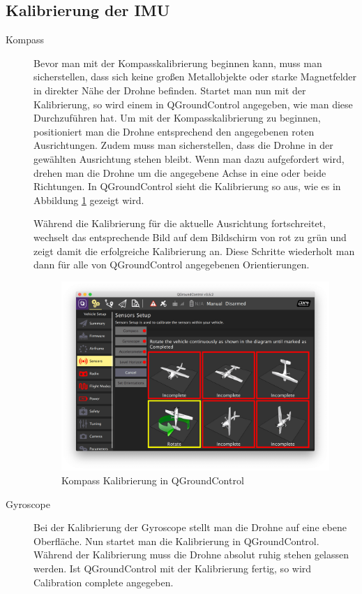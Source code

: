 \subsection{Kalibrierung der IMU}
\begin{description}
    \item[Kompass] Bevor man mit der Kompasskalibrierung beginnen kann, muss man sicherstellen, dass sich keine großen Metallobjekte oder starke Magnetfelder in direkter Nähe der Drohne befinden. Startet man nun mit der Kalibrierung, so wird einem in QGroundControl angegeben, wie man diese Durchzuführen hat. Um mit der Kompasskalibrierung zu beginnen, positioniert man die Drohne entsprechend den angegebenen roten Ausrichtungen. Zudem muss man sicherstellen, dass die Drohne in der gewählten Ausrichtung stehen bleibt. Wenn man dazu aufgefordert wird, drehen man die Drohne um die angegebene Achse in eine oder beide Richtungen. In QGroundControl sieht die Kalibrierung so aus, wie es in Abbildung \ref{fig:compass-calibration} gezeigt wird.

    Während die Kalibrierung für die aktuelle Ausrichtung fortschreitet, wechselt das entsprechende Bild auf dem Bildschirm von rot zu grün und zeigt damit die erfolgreiche Kalibrierung an. Diese Schritte wiederholt man dann für alle von QGroundControl angegebenen Orientierungen.
    \begin{figure}[H]
        \includegraphics[width=\textwidth]{./images/qgc-cal-compass.png}
        \caption{Kompass Kalibrierung in QGroundControl}\label{fig:compass-calibration}
    \end{figure}
    
    \item[Gyroscope] Bei der Kalibrierung der Gyroscope stellt man die Drohne auf eine ebene Oberfläche. Nun startet man die Kalibrierung in QGroundControl. Während der Kalibrierung muss die Drohne absolut ruhig stehen gelassen werden. Ist QGroundControl mit der Kalibrierung fertig, so wird Calibration complete angegeben.
    

\end{description}
